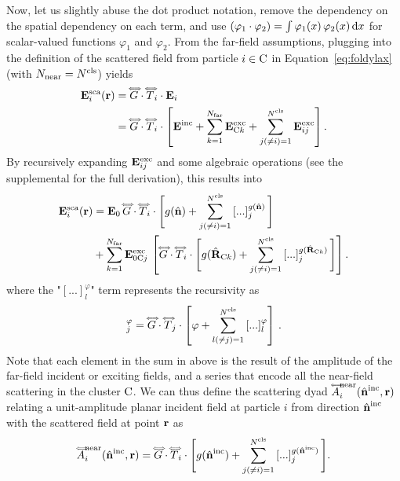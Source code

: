 Now, let us slightly abuse the dot product notation, remove the dependency on the spatial dependency on each term, and use $(\varphi_1 \cdot \varphi_2) = \int \varphi_1(x)\,\varphi_2(x) \,\mathrm{d} x$ for scalar-valued functions $\varphi_1$ and $\varphi_2$. From the far-field assumptions, plugging  into the definition of the scattered field from particle $i\in\mathrm{C}$ in Equation~\eqref{eq:foldylax} (with $N_\mathrm{near}=N^\mathrm{cls}$) yields
\begin{equation}
    \label{eq:scafieldcluster1}
    \begin{split}
        \mathbf{E}^\mathrm{sca}_i(\mathbf{r}) &= {\accentset{\Longleftrightarrow}{G}} \cdot {\accentset{\Longleftrightarrow}{T}}_i\cdot \mathbf{E}_i\\
        & = {\accentset{\Longleftrightarrow}{G}} \cdot {\accentset{\Longleftrightarrow}{T}}_i \cdot \left[\mathbf{E}^\mathrm{inc} + \sum_{k=1}^{N_\mathrm{far}} \mathbf{E}^\mathrm{exc}_{\mathrm{C} k}+ \sum_{j(\neq i)=1}^{N^\mathrm{cls}} \mathbf{E}^\mathrm{exc}_{ij} \right].
    \end{split}        
\end{equation}
By recursively expanding $\mathbf{E}^\mathrm{exc}_{ij}$ and some algebraic operations (see the supplemental for the full derivation), this results into 
\begin{align}
    \label{eq:scafieldcluster5}
    \mathbf{E}^\mathrm{sca}_i(\mathbf{r}) &= \mathbf{E}_0 \, {\accentset{\Longleftrightarrow}{G}} \cdot {\accentset{\Longleftrightarrow}{T}}_i \cdot \Bigg[ g(\hat{\mathbf{n}}) + \sum_{j(\neq i)=1}^{N^\mathrm{cls}} \left[...\right]_j^{g(\hat{\mathbf{n}})} \Bigg] \\
    & + \sum_{k=1}^{N_\mathrm{far}} \mathbf{E}^\mathrm{exc}_{0\mathrm{C} j}\,\left[ {\accentset{\Longleftrightarrow}{G}} \cdot {\accentset{\Longleftrightarrow}{T}}_i \cdot \Bigg[ g(\hat{\mathbf{R}}_{\mathrm{C} k}) + \sum_{j(\neq i)=1}^{N^\mathrm{cls}} \left[...\right]_j^{g(\hat{\mathbf{R}}_{\mathrm{C} k})}\Bigg]\right]. \nonumber 
\end{align}
where the "$[...]_l^\varphi$" term represents the recursivity as
\begin{equation}
    [...]_j^\varphi= \dyad{G} \cdot \dyad{T}_j \cdot \left[\varphi + \sum_{l(\neq j)=1}^{\Ncls} \left[...\right]_l^\varphi\right] \,.
\end{equation}
Note that each element in the sum in  above is the result of the amplitude of the far-field incident or exciting fields, and a series that encode all the near-field scattering in the cluster $\mathrm{C}$. We can thus define the scattering dyad ${\accentset{\Longleftrightarrow}{A}}_i^\text{near}({\hat{\mathbf{n}}}^\mathrm{inc},\mathbf{r})$ relating a unit-amplitude planar incident field at particle $i$ from direction ${\hat{\mathbf{n}}}^\mathrm{inc}$ with the scattered field at point $\mathbf{r}$ as
\begin{equation}
    {\accentset{\Longleftrightarrow}{A}}_i^\text{near}({\hat{\mathbf{n}}}^\mathrm{inc},\mathbf{r}) = {\accentset{\Longleftrightarrow}{G}} \cdot {\accentset{\Longleftrightarrow}{T}}_i\cdot \Bigg[ g({\hat{\mathbf{n}}}^\mathrm{inc}) + \sum_{j(\neq i)=1}^{N^\mathrm{cls}} \left[...\right]_j^{g({\hat{\mathbf{n}}}^\mathrm{inc})} \Bigg].
    \label{eq:scatdyad_near}
\end{equation}

